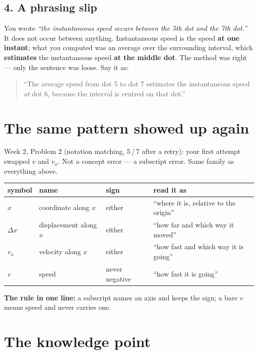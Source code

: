 \documentclass[11pt]{article}
\begin{document}
\subsection*{4. A phrasing slip}

You wrote \emph{``the instantaneous speed occurs between the 5th dot and the 7th dot.''}
It does not occur between anything. Instantaneous speed is the speed \textbf{at one
instant}; what you computed was an average over the surrounding interval, which
\textbf{estimates} the instantaneous speed \textbf{at the middle dot}. The method was
right --- only the sentence was loose. Say it as:

\begin{quote}
``The average speed from dot 5 to dot 7 estimates the instantaneous speed \emph{at} dot 6,
because the interval is centred on that dot.''
\end{quote}

\section{The same pattern showed up again}

Week 2, Problem 2 (notation matching, 5\,/\,7 after a retry): your first attempt swapped
$v$ and $v_x$. Not a concept error --- a subscript error. Same family as everything above.

\begin{center}
\renewcommand{\arraystretch}{1.3}
\begin{tabular}{@{}llll@{}}
\toprule
symbol & name & sign & read it as \\
\midrule
$x$      & coordinate along $x$   & either        & ``where it is, relative to the origin'' \\
$\Delta x$ & displacement along $x$ & either        & ``how far and which way it moved'' \\
$v_x$    & velocity along $x$     & either        & ``how fast and which way it is going'' \\
$v$      & speed                  & never negative & ``how fast it is going'' \\
\bottomrule
\end{tabular}
\end{center}

\medskip
\textbf{The rule in one line:} a subscript names an axis and keeps the sign; a bare $v$
means speed and never carries one.

\section{The knowledge point}
\end{document}
